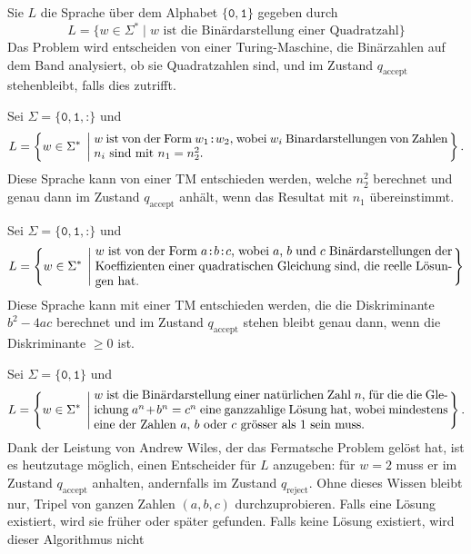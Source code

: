 \begin{loesung}
\begin{teilaufgaben}
\item Sie $L$ die Sprache über dem Alphabet $\{\texttt{0}, \texttt{1}\}$
gegeben durch
\[
L=\{ w\in\Sigma^*
\mid
\text{$w$ ist die Binärdarstellung einer Quadratzahl}
\}
\]
Das Problem wird entscheiden von einer Turing-Maschine, die Binärzahlen auf
dem Band analysiert, ob sie Quadratzahlen sind, und im Zustand
$q_{\text{accept}}$ stehenbleibt, falls dies zutrifft.
\item
Sei $\Sigma=\{\texttt{0},\texttt{1},\texttt{:}\}$ und
\[
L=\left\{w\in\Sigma^*\;\left|\;
\begin{minipage}{4truein}
$w$ ist von der Form $w_1\texttt{:}w_2$, wobei $w_i$ Binardarstellungen
von Zahlen $n_i$ sind mit $n_1=n_2^2$.
\end{minipage}
\right.\right\}.
\]
Diese Sprache kann von einer TM entschieden werden, welche $n_2^2$ 
berechnet und genau dann im Zustand $q_{\text{accept}}$ anhält, wenn
das Resultat mit $n_1$ übereinstimmt.
\item 
Sei $\Sigma=\{\texttt{0},\texttt{1},\texttt{:}\}$ und 
\[
L=\left\{w\in\Sigma^*\;\left|\;
\begin{minipage}{4truein}
$w$ ist von der Form $a\texttt{:}b\texttt{:}c$, wobei $a$, $b$ und $c$
Binärdarstellungen der Koeffizienten einer quadratischen Gleichung sind,
die reelle Lösungen hat.
\end{minipage}
\right.\right\}
\]
Diese Sprache kann mit einer TM entschieden werden, die die Diskriminante
$b^2-4ac$ berechnet und im Zustand $q_{\text{accept}}$ stehen bleibt genau
dann, wenn die Diskriminante $\ge 0$ ist.
\item 
Sei $\Sigma=\{\texttt{0},\texttt{1}\}$ und
\[
L=\left\{ w\in\Sigma^*\;\left|\;
\begin{minipage}{4truein}
$w$ ist die Binärdarstellung einer natürlichen Zahl $n$, für die
die Gleichung $a^n+b^n=c^n$ eine ganzzahlige Lösung hat, wobei mindestens
eine der Zahlen $a$, $b$ oder $c$ grösser als $1$ sein muss.
\end{minipage}
\right.\right\}.
\]
Dank der Leistung von Andrew Wiles, der das Fermatsche Problem gelöst hat,
ist es heutzutage möglich, einen
Entscheider für $L$ anzugeben: für $w=2$ muss er im Zustand
$q_{\text{accept}}$ anhalten, andernfalls im Zustand $q_{\text{reject}}$.
Ohne dieses Wissen bleibt nur, Tripel von ganzen Zahlen $(a,b,c)$
durchzuprobieren. Falls eine Lösung existiert, wird sie früher oder später
gefunden. Falls keine Lösung existiert, wird dieser Algorithmus nicht

\end{teilaufgaben}
\end{loesung}
